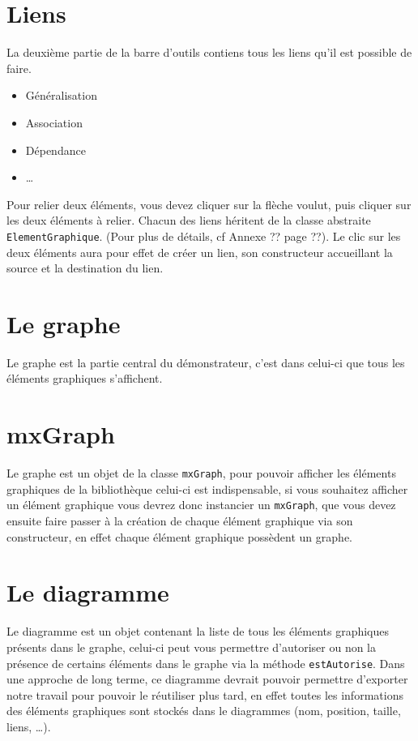 \documentclass[12pt,a4paper,openany]{book}
\begin{document}
	\section{Liens}
	La deuxième partie de la barre d'outils contiens tous les liens qu'il est possible de faire.
	\begin{itemize}
		\item Généralisation
		\item Association
		\item Dépendance
		\item \ldots
	\end{itemize}
	Pour relier deux éléments, vous devez cliquer sur la flèche voulut, puis cliquer sur les deux éléments à relier. 
	Chacun des liens héritent de la classe abstraite \texttt{ElementGraphique}. (Pour plus de détails, cf Annexe ?? page ??).%
	Le clic sur les deux éléments aura pour effet de créer un lien, son constructeur accueillant la source et la destination du lien.
	
	\section{Le graphe}
	Le graphe est la partie central du démonstrateur, c'est dans celui-ci que tous les éléments graphiques s'affichent.
	\section{mxGraph}
	Le graphe est un objet de la classe \texttt{mxGraph}, pour pouvoir afficher les éléments graphiques de la bibliothèque 
	celui-ci est indispensable, si vous souhaitez afficher un élément graphique vous devrez donc instancier 
	un \texttt{mxGraph}, que vous devez ensuite faire passer à la création de chaque élément graphique via son constructeur, 
	en effet chaque élément graphique possèdent un graphe.

	\section{Le diagramme}
	Le diagramme est un objet contenant la liste de tous les éléments graphiques présents dans le graphe, celui-ci peut vous permettre
	d'autoriser ou non la présence de certains éléments dans le graphe via la méthode \texttt{estAutorise}. Dans une approche de long
	terme, ce diagramme devrait pouvoir permettre d'exporter notre travail pour pouvoir le réutiliser plus tard, 
	en effet toutes les informations des éléments graphiques sont stockés dans le diagrammes (nom, position, taille, liens, \ldots).
\end{document}
